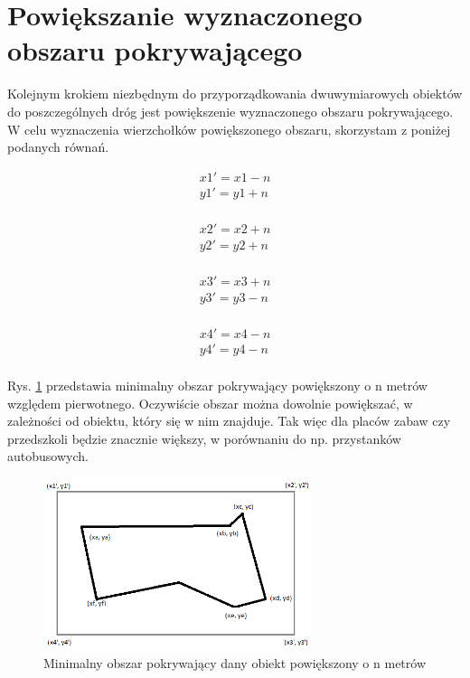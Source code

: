 \newpage
\section{Powiększanie wyznaczonego obszaru pokrywającego}
\label{sec:Powiększanie wyznaczonegoobszarupokrywającego}

Kolejnym krokiem niezbędnym do przyporządkowania dwuwymiarowych obiektów do poszczególnych dróg jest powiększenie wyznaczonego obszaru pokrywającego. W celu wyznaczenia wierzchołków powiększonego obszaru, skorzystam z poniżej podanych równań.

\begin{equation}
\begin{split}
x1' = x1 - n \\
y1' = y1 + n \\
\end{split}
\end{equation}

\begin{equation}
\begin{split}
x2' = x2 + n \\
y2' = y2 + n \\
\end{split}
\end{equation}

\begin{equation}
\begin{split}
x3' = x3 + n \\
y3' = y3 - n \\
\end{split}
\end{equation}

\begin{equation}
\begin{split}
x4' = x4 - n \\
y4' = y4 - n \\
\end{split}
\end{equation}

Rys. \ref{sec:thirdBB} przedstawia minimalny obszar pokrywający powiększony o n metrów względem pierwotnego. Oczywiście obszar można dowolnie powiększać, w zależności od obiektu, który się w nim znajduje. Tak więc dla placów zabaw czy przedszkoli będzie znacznie większy, w porównaniu do np. przystanków autobusowych.

\begin{figure}[h]
\caption{Minimalny obszar pokrywający dany obiekt powiększony o n metrów}
\label{sec:thirdBB}
\centering
\includegraphics[width=0.7\textwidth]{BoundingBoxExtended}
\end{figure}

